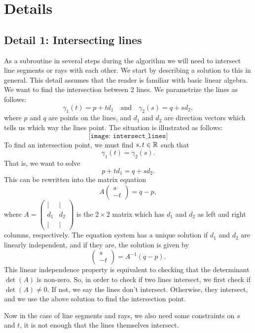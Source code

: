 \section{Details}

\subsection*{Detail 1: Intersecting lines}
As a subroutine in several steps during the algorithm we will need to intersect line segments or rays with each other. We start by describing a solution to this in general. This detail assumes that the reader is familiar with basic linear algebra. We want to find the intersection between 2 lines. We parametrize the lines as follows:
\[
    \gamma_1(t) = p + t d_1 \quad \text{and} \quad
    \gamma_2(s) = q + s d_2,
\]
where $p$ and $q$ are points on the lines, and $d_1$ and $d_2$ are direction vectors which tells us which way the lines point. The situation is illustrated as follows:
\[
    \texttt{[image: intersect\_lines]}
\]
To find an intersection point, we must find $s, t \in \mathbb{R}$ such that
\[
    \gamma_1(t) = \gamma_2(s).
\]
That is, we want to solve
\[
    p + t d_1 = q + s d_2.
\]
This can be rewritten into the matrix equation
\[
    A \begin{pmatrix}
        s \\
        -t
    \end{pmatrix}
    =
    q - p,
\]
where $A = \begin{pmatrix} \mid & \mid \\ d_1 & d_2 \\ \mid & \mid \end{pmatrix}$ is the $2 \times 2$ matrix which has $d_1$ and $d_2$ as left and right columns, respectively. The equation system has a unique solution if $d_1$ and $d_2$ are linearly independent, and if they are, the solution is given by
\[
    \begin{pmatrix}
        s \\
        -t
    \end{pmatrix}
    =
    A^{-1} (q - p).
\]
This linear independence property is equivalent to checking that the determinant $\det(A)$ is non-zero. So, in order to check if two lines intersect, we first check if $\det(A) \ne 0$. If not, we say the lines don't intersect. Otherwise, they intersect, and we use the above solution to find the intersection point.

Now in the case of line segments and rays, we also need some constraints on $s$ and $t$, it is not enough that the lines themselves intersect.

